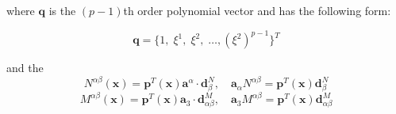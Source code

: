 where $\boldsymbol q$ is the $(p-1)$th order polynomial vector and has the following form:

\begin{equation}
\boldsymbol q = \{ 1,\; \xi^1,\; \xi^2,\; \dots, (\xi^2)^{p-1}\}^T
\end{equation}

and the 
\begin{equation}
N^{\alpha\beta}(\boldsymbol x) = \boldsymbol p^T(\boldsymbol x) \boldsymbol a^\alpha \cdot \boldsymbol d_{\beta}^N,\quad
\boldsymbol a_\alpha N^{\alpha\beta} = \boldsymbol p^T(\boldsymbol x) \boldsymbol d^N_\beta
\end{equation}
\begin{equation}
    M^{\alpha\beta}(\boldsymbol x) = \boldsymbol p^T(\boldsymbol x) \boldsymbol a_3 \cdot \boldsymbol d_{\alpha\beta}^M,\quad
    \boldsymbol a_3 M^{\alpha\beta} = \boldsymbol p^T(\boldsymbol x) \boldsymbol d_{\alpha\beta}^M
\end{equation}
